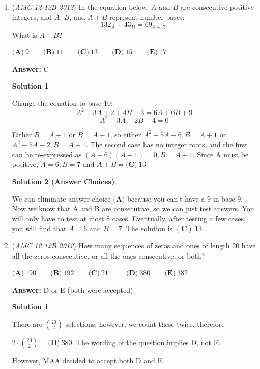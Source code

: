 \begin{enumerate}
 


	\item (\textit{AMC 12 12B 2012}) In the equation below, $A$ and $B$ are consecutive positive integers, and $A$, $B$, and $A+B$ represent number bases: 
 \[132_A+43_B=69_{A+B}.\]
What is $A+B$?


 $\textbf{(A)}\ 9\qquad\textbf{(B)}\ 11\qquad\textbf{(C)}\ 13\qquad\textbf{(D)}\ 15\qquad\textbf{(E)}\ 17$

 \textbf{Answer: }C



\textbf{Solution 1}

Change the equation to base 10: 
 \[A^2 + 3A +2 + 4B +3= 6A + 6B + 9\] 
 \[A^2 - 3A - 2B - 4=0\] 

 Either $B = A + 1$ or $B = A - 1$, so either $A^2 - 5A - 6, B = A + 1$ or $A^2 - 5A - 2, B = A - 1$. The second case has no integer roots, and the first can be re-expressed as $(A-6)(A+1) = 0, B = A + 1$. Since A must be positive, $A = 6, B = 7$ and $A+B = \boxed{\textbf{(C)}\ 13}$




\textbf{Solution 2 (Answer Choices)}

We can eliminate answer choice $\textbf{(A)}$ because you can't have a $9$ in base $9$. Now we know that A and B are consecutive, so we can just test answers. You will only have to test at most $8$ cases. Eventually, after testing a few cases, you will find that $A=6$ and $B=7$. The solution is $\boxed{\mathbf{(C)}\ 13}$.

 


	\item (\textit{AMC 12 12B 2012}) How many sequences of zeros and ones of length 20 have all the zeros consecutive, or all the ones consecutive, or both?


 $\textbf{(A)}\ 190\qquad\textbf{(B)}\ 192\qquad\textbf{(C)}\ 211\qquad\textbf{(D)}\ 380\qquad\textbf{(E)}\ 382$

 \textbf{Answer: }D or E (both were accepted)



\textbf{Solution 1}

There are $\binom{20}{2}$ selections; however, we count these twice, therefore

 $2\cdot\binom{20}{2} = \boxed{\textbf{(D)}\ 380}$. The wording of the question implies D, not E.

 However, MAA decided to accept both D and E.

 




\end{enumerate}
